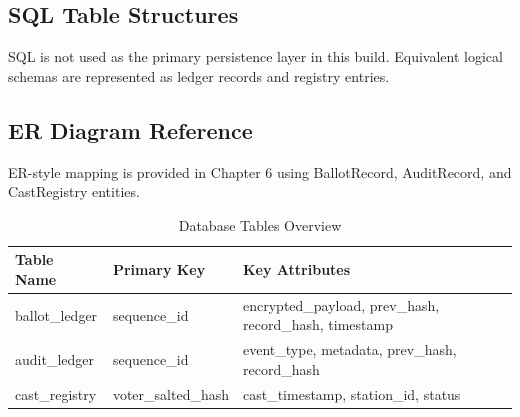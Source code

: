 \subsection{SQL Table Structures}
SQL is not used as the primary persistence layer in this build. Equivalent logical schemas are represented as ledger records and registry entries.

\subsection{ER Diagram Reference}
ER-style mapping is provided in Chapter 6 using BallotRecord, AuditRecord, and CastRegistry entities.

\begin{table}[htbp]
\centering
\caption{Database Tables Overview}
\begin{tabular}{p{}p{}p{}}
\toprule
Table Name & Primary Key & Key Attributes \\
\midrule
ballot\_ledger & sequence\_id & encrypted\_payload, prev\_hash, record\_hash, timestamp \\
audit\_ledger & sequence\_id & event\_type, metadata, prev\_hash, record\_hash \\
cast\_registry & voter\_salted\_hash & cast\_timestamp, station\_id, status \\
\bottomrule
\end{tabular}
\end{table}

\clearpage
